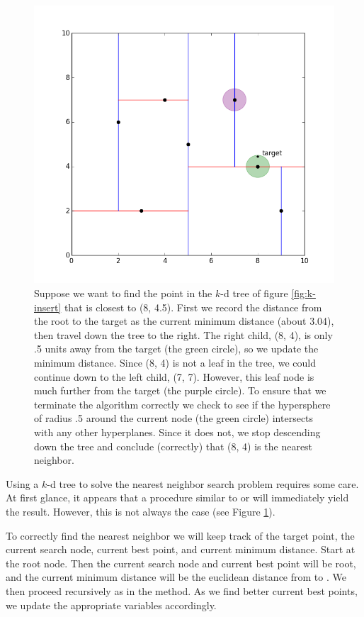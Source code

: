 \begin{figure}[H]
\includegraphics[width=\textwidth]{kdpic3.png}
\caption{Suppose we want to find the point in the $k$-d tree of figure \ref{fig:k-insert} that is closest to (8, 4.5). First we record the distance from the root to the target as the current minimum distance (about 3.04), then travel down the tree to the right. The right child, (8, 4), is only .5 units away from the target (the green circle), so we update the minimum distance. Since (8, 4) is not a leaf in the tree, we could continue down to the left child, (7, 7). However, this leaf node is much further from the target (the purple circle). To ensure that we terminate the algorithm correctly we check to see if the hypersphere of radius .5 around the current node (the green circle) intersects with any other hyperplanes. Since it does not, we stop descending down the tree and conclude (correctly) that (8, 4) is the nearest neighbor.}
\label{fig:bad-search}
\end{figure}

Using a $k$-d tree to solve the nearest neighbor search problem requires some care.
At first glance, it appears that a procedure similar to  or  will immediately yield the result.
However, this is not always the case (see Figure \ref{fig:bad-search}).

To correctly find the nearest neighbor we will keep track of the target point, the current search node, current best point, and current minimum distance.
Start at the root node.
Then the current search node and current best point will be root, and the current minimum distance will be the euclidean distance from  to .
We then proceed recursively as in the  method.
As we find better current best points, we update the appropriate variables accordingly.

